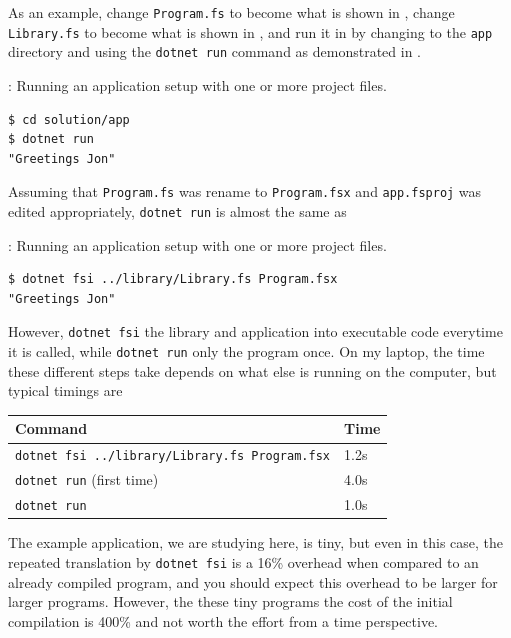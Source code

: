 \documentclass[fsharpNotes.tex]{subfiles}
\begin{document}
As an example, change \lstinline[language=console]{Program.fs} to become what is shown in ,
change \lstinline[language=console]{Library.fs} to become what is shown in , 
and run it in  by changing to the \lstinline[language=console]{app} directory and using the \lstinline[language=console]{dotnet run} command as demonstrated in .
\begin{codeNOutput}[label=dotnetRun,
  top=-5pt,
  bottom=-5pt,
  left=-2pt,
  right=-2pt,
]{: Running an application setup with one or more project files.}
  \begin{lstlisting}[language=console,escapechar=§]
$ cd solution/app
$ dotnet run
"Greetings Jon"
\end{lstlisting}%
\end{codeNOutput}
Assuming that \lstinline[language=console]{Program.fs} was rename to \lstinline[language=console]{Program.fsx} and \lstinline[language=console]{app.fsproj} was edited appropriately, \lstinline[language=console]{dotnet run} is almost the same as
\begin{codeNOutput}[label=dotnetRun,
  top=-5pt,
  bottom=-5pt,
  left=-2pt,
  right=-2pt,
]{: Running an application setup with one or more project files.}
  \begin{lstlisting}[language=console,escapechar=§]
$ dotnet fsi ../library/Library.fs Program.fsx
"Greetings Jon"
\end{lstlisting}%
\end{codeNOutput}
However, \lstinline[language=console]{dotnet fsi}  the library and application into executable code everytime it is called, while \lstinline[language=console]{dotnet run} only  the program once. On my laptop, the time these different steps take depends on what else is running on the computer, but typical timings are
\begin{center}
  \begin{tabular}{|l|l|}
    \hline
    \rowcolor{headerRowColor} Command & Time\\
    \hline
    \lstinline[language=console]|dotnet fsi ../library/Library.fs Program.fsx| & 1.2s\\
    \lstinline[language=console]|dotnet run| (first time) & 4.0s\\
    \lstinline[language=console]|dotnet run| & 1.0s\\
    \hline
\end{tabular}
\end{center}
The example application, we are studying here, is tiny, but even in this case, the repeated translation by \lstinline[language=console]{dotnet fsi} is a 16\% overhead when compared to an already compiled program, and you should expect this overhead to be larger for larger programs. However, the these tiny programs the cost of the initial compilation is 400\% and not worth the effort from a time perspective.
\end{document}
